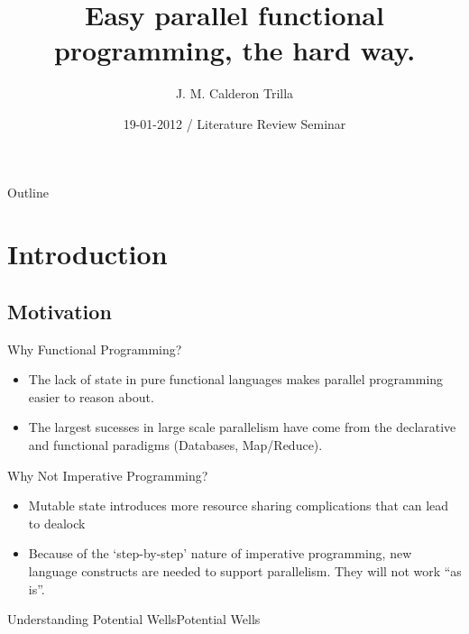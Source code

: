 \documentclass{beamer}
\title[Parallel Graph Reduction] %
{Easy parallel functional programming, the hard way.}
\subtitle
{} %
\author[] %
{J. M. Calderon Trilla}
\institute[University of York] %
{%
  Department of Computer Science\\
  PLASMA Research Group \\
  University of York
 }
\date[] %
{19-01-2012 / Literature Review Seminar}
\begin{document}
\begin{frame}
  \titlepage
\end{frame}

\begin{frame}{Outline}
  \tableofcontents
\end{frame}




\section{Introduction}

\subsection[Motivation]{Motivation}

\begin{frame}{Why Functional Programming?}
    \begin{itemize}
        \item
            The lack of state in pure functional languages makes parallel programming easier to 
            reason about. 
        \item
            The largest sucesses in large scale parallelism have come from the declarative
            and functional paradigms (Databases, Map/Reduce).
    \end{itemize}
\end{frame}

\begin{frame}{Why Not Imperative Programming?}
    \begin{itemize}
        \item
            Mutable state introduces more resource sharing complications that can lead to dealock
        \item
            Because of the `step-by-step' nature of imperative programming, new language 
            constructs are needed to support parallelism. They will not work ``as is''. 
    \end{itemize}
\end{frame}
\begin{frame}[fragile]{Understanding Potential Wells}{Potential Wells}

\end{frame}
\end{document}
